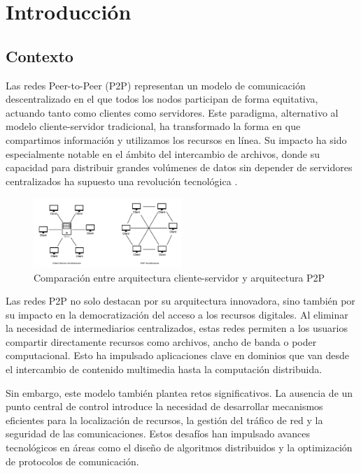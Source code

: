 \chapter{Introducción}
\label{cap:introduccion}


\section{Contexto}

Las redes Peer-to-Peer (P2P) representan un modelo de comunicación descentralizado en el que todos los nodos participan de forma equitativa, actuando tanto como clientes como servidores.
Este paradigma, alternativo al modelo cliente-servidor tradicional, ha transformado la forma en que compartimos información y utilizamos los recursos en línea.
Su impacto ha sido especialmente notable en el ámbito del intercambio de archivos, donde su capacidad para distribuir grandes volúmenes de datos sin depender de servidores centralizados ha supuesto una revolución tecnológica \cite{schollmeier2001}.

\begin{figure}[h]
    \centering
    \includegraphics[width = 0.5\textwidth]{Imagenes/Vectorial/client-server-vs-p2p}
    \caption{Comparaci\'on entre arquitectura cliente-servidor y arquitectura P2P}
    \label{fig:clientVsp2p}
\end{figure}


Las redes P2P no solo destacan por su arquitectura innovadora, sino también por su impacto en la democratización del acceso a los recursos digitales.
Al eliminar la necesidad de intermediarios centralizados, estas redes permiten a los usuarios compartir directamente recursos como archivos, ancho de banda o poder computacional.
Esto ha impulsado aplicaciones clave en dominios que van desde el intercambio de contenido multimedia hasta la computación distribuida.

Sin embargo, este modelo también plantea retos significativos.
La ausencia de un punto central de control introduce la necesidad de desarrollar mecanismos eficientes para la localización de recursos, la gestión del tráfico de red y la seguridad de las comunicaciones.
Estos desafíos han impulsado avances tecnológicos en áreas como el diseño de algoritmos distribuidos y la optimización de protocolos de comunicación.

